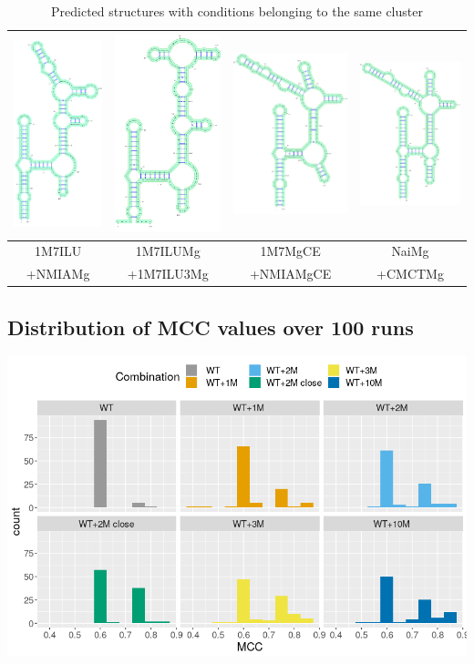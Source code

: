 \documentclass[11pt]{article} %
\begin{document}
\begin{table}
\newcommand{\MyScale}{.2}
\begin{tabular}{@{}cccc@{}}

 \includegraphics[scale=\MyScale]{graphs/Supp_structures/1M7ILU_NMIAMg}& \includegraphics[scale=\MyScale]{graphs/Supp_structures/1M7ILUMg_1M7ILU3Mg}& \includegraphics[scale=\MyScale]{graphs/Supp_structures/1M7MgCE_NMIAMgCE}& \includegraphics[scale=\MyScale]{graphs/Supp_structures/NaiMg_CMCTMg}\\
 \midrule
1M7ILU&1M7ILUMg&1M7MgCE&NaiMg\\
+NMIAMg&+1M7ILU3Mg&+NMIAMgCE&+CMCTMg\\
\end{tabular}
\caption{Predicted structures with conditions belonging to the same cluster}
\end{table}

\subsection{Distribution of MCC values over 100 runs}
\includegraphics[width=\linewidth]{graphs/histog1}
\end{document}
